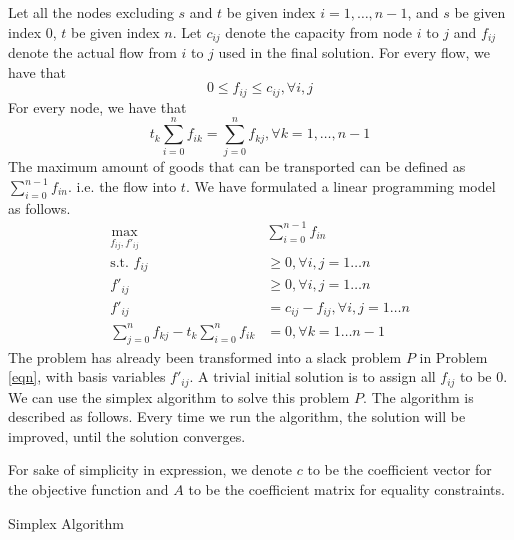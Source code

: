 \begin{exercise}[]
\begin{solution}
    Let all the nodes excluding $s$ and $t$ be given index $i=1,\ldots,n-1$, and $s$ be given index $0$, $t$ be given index $n$. Let $c_{ij}$ denote the capacity from node $i$ to $j$ and $f_{ij}$ denote the actual flow from $i$ to $j$ used in the final solution. For every flow, we have that
    \begin{equation}
      0 \le f_{ij} \le c_{ij}, \forall i, j
    \end{equation}
    For every node, we have that
    \begin{equation}
      t_k  \sum_{i=0}^{n} f_{ik} = \sum_{j=0}^n f_{kj}, \forall k=1,\ldots,n-1
    \end{equation}
    The maximum amount of goods that can be transported can be defined as $\sum_{i=0}^{n-1} f_{in}$. i.e. the flow into $t$. We have formulated a linear programming model as follows.
    \begin{equation}
      \begin{aligned}
        \max_{f_{ij}, f'_{ij}}  & \sum_{i=0}^{n-1} f_{in} \\
        \text{s.t. } f_{ij} &\ge 0, \forall i,j = 1 \ldots n\\
        f'_{ij} &\ge 0, \forall i,j = 1 \ldots n \\
        f'_{ij} &= c_{ij} - f_{ij}, \forall i,j = 1 \ldots n\\
         \sum_{j=0}^n f_{kj} -  t_k \sum_{i=0}^{n} f_{ik} &= 0, \forall k = 1 \ldots n-1
      \end{aligned}
      \label{eqn}
    \end{equation}
    The problem has already been transformed into a slack problem $P$ in Problem \ref{eqn}, with basis variables $f'_{ij}$. A trivial initial solution is to assign all $f_{ij}$ to be 0.
    We can use the simplex algorithm to solve this problem $P$. The algorithm is described as follows. Every time we run the algorithm, the solution will be improved, until the solution converges.


    For sake of simplicity in expression, we denote $c$ to be the coefficient vector for the objective function and $A$ to be the coefficient matrix for equality constraints.
    
\begin{algorithm}[H]
  \setcounter{algocf}{1}
  \caption{Simplex Algorithm}
  \label{algo2}
  
  \AlgoDisplayBlockMarkers\AlgoDisplayGroupMarkers\SetAlgoBlockMarkers{ \{}{ \}\ }%
  \SetAlgoNoEnd\SetAlgoNoLine
  

\end{algorithm}
\end{solution}
\end{exercise}
